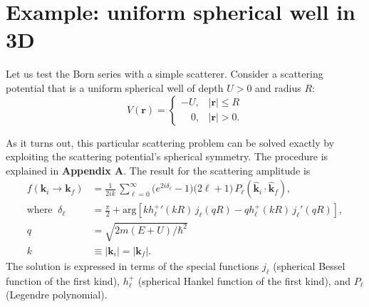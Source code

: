 \documentclass[pra,12pt]{revtex4-2}
\begin{document}
\section{Example: uniform spherical well in 3D}

Let us test the Born series with a simple scatterer.  Consider a
scattering potential that is a uniform spherical well of depth $U > 0$
and radius $R$:
\begin{equation}
  V(\mathbf{r}) = \begin{cases}-U, & |\mathbf{r}| \le R \\ \;\;\;\,0,
    & |\mathbf{r}| > 0. \end{cases}
\end{equation}

As it turns out, this particular scattering problem can be solved
exactly by exploiting the scattering potential's spherical symmetry.
The procedure is explained in \textbf{Appendix A}.  The result for the
scattering amplitude is
\begin{equation}
  \begin{aligned}f(\mathbf{k}_i \rightarrow \mathbf{k}_f) &= \frac{1}{2ik}\, \sum_{\ell =0}^\infty \big(e^{2i\delta_\ell} - 1\big) \big(2\ell+1\big)\, P_{\ell}(\hat{\mathbf{k}}_i\cdot \hat{\mathbf{k}}_f), \\ \mathrm{where}\;\; \delta_\ell &= \frac{\pi}{2} + \mathrm{arg}\!\left[k {h_\ell^+}'(kR) \, j_\ell(qR) - qh_\ell^+(kR)\, j_\ell'(qR)\right], \\ q &= \sqrt{2m(E+U)/\hbar^2} \\ k &\equiv |\mathbf{k}_i| = |\mathbf{k}_f|.\end{aligned}
  \label{fresult_well}
\end{equation}
The solution is expressed in terms of the special functions $j_\ell$
(spherical Bessel function of the first kind), $h_\ell^+$ (spherical
Hankel function of the first kind), and $P_\ell$ (Legendre
polynomial).
\end{document}
